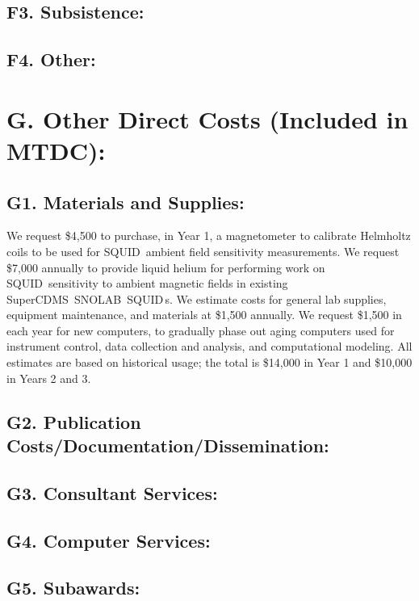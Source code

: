 \documentclass[11pt]{article}
\newcommand{\SNOLAB}{{\small SNOLAB}}
\newcommand{\SuperCDMS}{{\small SuperCDMS}}
\newcommand{\SQUID}{{\small SQUID}}
\newcommand{\SQUIDs}{{\small SQUID\,s}}
\begin{document}
\subsection*{F3. Subsistence:}

\subsection*{F4. Other:}

\section*{G. Other Direct Costs (Included in MTDC):}
\subsection*{G1. Materials and Supplies:}
We request \$4,500 to purchase, in Year 1, a magnetometer to calibrate Helmholtz coils to be used for \SQUID\ ambient field sensitivity measurements. We request \$7,000 annually to provide liquid helium for performing work on \SQUID\ sensitivity to ambient magnetic fields in existing \SuperCDMS\ \SNOLAB\ \SQUIDs. We estimate costs for general lab supplies, equipment maintenance, and materials at \$1,500 annually. We request \$1,500 in each year for new computers, to gradually phase out aging computers used for instrument control, data collection and analysis, and computational modeling.  All estimates are based on historical usage; the total is \$14,000 in Year 1 and \$10,000 in Years 2 and 3. 

\subsection*{G2. Publication Costs/Documentation/Dissemination:}

\subsection*{G3. Consultant Services:}

\subsection*{G4. Computer Services:}

\subsection*{G5. Subawards:}
\end{document}
